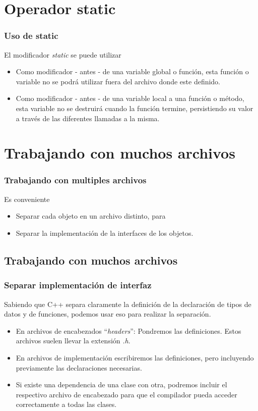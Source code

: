 \documentclass{beamer}
\begin{document}
\section{Operador static}

\begin{frame}
\frametitle{Uso de static}
  El modificador \emph{static} se puede utilizar

\begin{itemize}
 \item Como modificador - antes - de una variable global o función, esta función o variable no se podrá utilizar fuera del archivo donde este definido.
 \item Como modificador - antes - de una variable local a una función o método, esta variable no se destruirá cuando la función termine, persistiendo su valor a través de las diferentes llamadas a la misma.
\end{itemize}
\end{frame}

\section{Trabajando con muchos archivos}

\begin{frame}
\frametitle{Trabajando con multiples archivos}
Es conveniente
\begin{itemize}
 \item Separar cada objeto en un archivo distinto, para 
 \item Separar la implementación de la interfaces de los objetos.
\end{itemize}

\end{frame}

\subsection{Trabajando con muchos archivos}

\begin{frame}
\frametitle{Separar implementación de interfaz}
Sabiendo que C++ separa claramente la definición de la declaración de tipos de datos y de funciones, podemos usar eso para realizar la separación.
\begin{itemize}
 \item En archivos de encabezados ``\emph{headers}'': Pondremos las definiciones. Estos archivos suelen llevar la extensión \emph{.h}.
 \item En archivos de implementación escribiremos las definiciones, pero incluyendo previamente las declaraciones necesarias.
 \item Si existe una dependencia de una clase con otra, podremos incluir el respectivo archivo de encabezado para que el compilador pueda acceder correctamente a todas las clases.
\end{itemize}
\end{frame}
\end{document}
